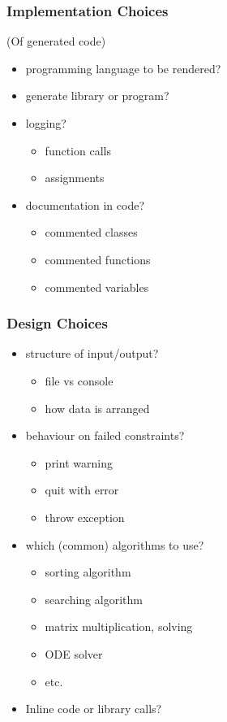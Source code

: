 \documentclass{beamer}
\begin{document}
\begin{frame}
\frametitle{{\color{blue}Implementation} Choices}
(Of generated code)
\begin{itemize}
\item programming language to be rendered?
\pause
\item generate library or program?
\pause
\item logging?
\begin{itemize}
\item function calls
\item assignments
\end{itemize}
\pause
\item documentation in code?
\begin{itemize}
\item commented classes
\item commented functions
\item commented variables 
\end{itemize}
\end{itemize}
\end{frame}

\begin{frame}
\frametitle{{\color{blue}Design} Choices}
\begin{itemize}
\item structure of input/output?
\begin{itemize}
\item file vs console
\item how data is arranged
\end{itemize}
\pause
\item behaviour on failed constraints?
\begin{itemize}
\item print warning
\item quit with error
\item throw exception
\end{itemize}
\pause
\item which (common) algorithms to use?
\begin{itemize}
\item sorting algorithm
\item searching algorithm
\item matrix multiplication, solving
\item ODE solver
\item etc.
\end{itemize}
\pause
\item Inline code or library calls?
\end{itemize}
\end{frame}
\end{document}
